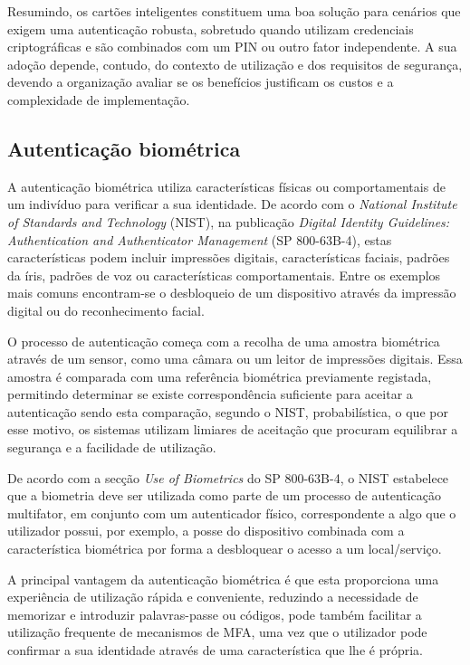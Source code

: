 \hspace{1cm} Resumindo, os cartões inteligentes constituem uma boa solução para cenários que exigem uma autenticação robusta, sobretudo quando utilizam credenciais criptográficas e são combinados com um PIN ou outro fator independente. A sua adoção depende, contudo, do contexto de utilização e dos requisitos de segurança, devendo a organização avaliar se os benefícios justificam os custos e a complexidade de implementação.

\subsection{Autenticação biométrica}

\hspace{1cm} A autenticação biométrica utiliza características físicas ou comportamentais de um indivíduo para verificar a sua identidade. De acordo com o \textit{National Institute of Standards and Technology} (NIST), na publicação \textit{Digital Identity Guidelines: Authentication and Authenticator Management} (SP 800-63B-4), estas características podem incluir impressões digitais, características faciais, padrões da íris, padrões de voz ou características comportamentais. Entre os exemplos mais comuns encontram-se o desbloqueio de um dispositivo através da impressão digital ou do reconhecimento facial.

\hspace{1cm} O processo de autenticação começa com a recolha de uma amostra biométrica através de um sensor, como uma câmara ou um leitor de impressões digitais. Essa amostra é comparada com uma referência biométrica previamente registada, permitindo determinar se existe correspondência suficiente para aceitar a autenticação sendo esta comparação, segundo o NIST, probabilística, o que por esse motivo, os sistemas utilizam limiares de aceitação que procuram equilibrar a segurança e a facilidade de utilização.

\hspace{1cm} De acordo com a secção \textit{Use of Biometrics} do SP 800-63B-4, o NIST estabelece que a biometria deve ser utilizada como parte de um processo de autenticação multifator, em conjunto com um autenticador físico, correspondente a algo que o utilizador possui, por exemplo, a posse do dispositivo combinada com a característica biométrica por forma a desbloquear o acesso a um local/serviço.

\hspace{1cm} A principal vantagem da autenticação biométrica é que esta proporciona uma experiência de utilização rápida e conveniente, reduzindo a necessidade de memorizar e introduzir palavras-passe ou códigos, pode também facilitar a utilização frequente de mecanismos de MFA, uma vez que o utilizador pode confirmar a sua identidade através de uma característica que lhe é própria.

